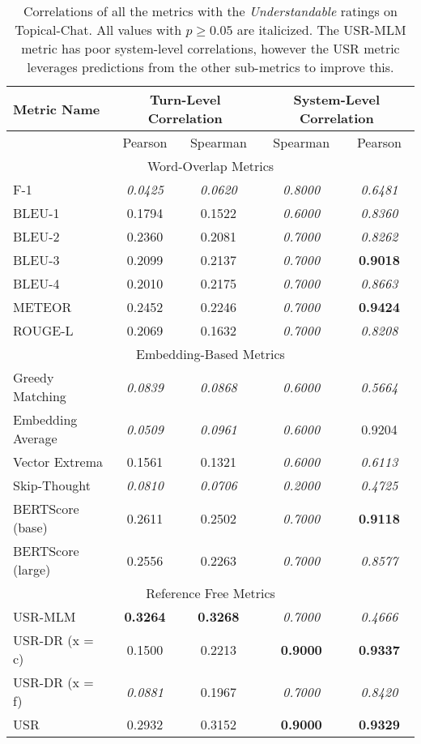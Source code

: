 \documentclass[11pt,a4paper]{article}
\begin{document}
\begin{table*}
    \centering
    \renewcommand*{\arraystretch}{1.2}
    \begin{tabular}{|l|c|c|c|c|}
    \hline
        \textbf{Metric Name} & \multicolumn{2}{|c|}{\textbf{Turn-Level Correlation}} & \multicolumn{2}{|c|}{\textbf{System-Level Correlation}}  \\ \hline
         & Pearson & Spearman & Spearman & Pearson \\ \hline
         \multicolumn{5}{|c|}{Word-Overlap Metrics} \\ \hline
F-1 & \textit{0.0425} & \textit{0.0620} & \textit{0.8000} & \textit{0.6481} \\
BLEU-1 & 0.1794 & 0.1522 & \textit{0.6000} & \textit{0.8360} \\
BLEU-2 & 0.2360 & 0.2081 & \textit{0.7000} & \textit{0.8262} \\
BLEU-3 & 0.2099 & 0.2137 & \textit{0.7000} & \textbf{0.9018} \\
BLEU-4 & 0.2010 & 0.2175 & \textit{0.7000} & \textit{0.8663} \\
METEOR & 0.2452 & 0.2246 & \textit{0.7000} & \textbf{0.9424} \\
ROUGE-L & 0.2069 & 0.1632 & \textit{0.7000} & \textit{0.8208} \\ \hline
\multicolumn{5}{|c|}{Embedding-Based Metrics} \\ \hline
Greedy Matching & \textit{0.0839} & \textit{0.0868} & \textit{0.6000} & \textit{0.5664} \\
Embedding Average & \textit{0.0509} & \textit{0.0961} & \textit{0.6000} & 0.9204 \\
Vector Extrema & 0.1561 & 0.1321 & \textit{0.6000} & \textit{0.6113} \\
Skip-Thought & \textit{0.0810} & \textit{0.0706} & \textit{0.2000} & \textit{0.4725} \\
BERTScore (base) & 0.2611 & 0.2502 & \textit{0.7000} & \textbf{0.9118} \\
BERTScore (large) & 0.2556 & 0.2263 & \textit{0.7000} & \textit{0.8577} \\ \hline
\multicolumn{5}{|c|}{Reference Free Metrics} \\ \hline
USR-MLM & \textbf{0.3264} & \textbf{0.3268} & \textit{0.7000} & \textit{0.4666} \\
USR-DR (x = c) & 0.1500 & 0.2213 & \textbf{0.9000} & \textbf{0.9337} \\
USR-DR (x = f) & \textit{0.0881} & 0.1967 & \textit{0.7000} & \textit{0.8420} \\
USR & 0.2932 & 0.3152 & \textbf{0.9000} & \textbf{0.9329} \\ \hline
    \end{tabular}
    \caption{Correlations of all the metrics with the \textit{Understandable} ratings on Topical-Chat. All values with $p \geq 0.05$ are italicized. The USR-MLM metric has poor system-level correlations, however the USR metric leverages predictions from the other sub-metrics to improve this.}
    
\end{table*}
\end{document}
